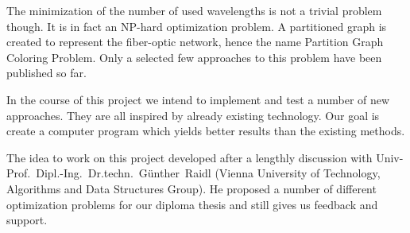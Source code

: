 \documentclass[paper=a4,fontsize=12pt]{scrartcl}
\begin{document}

The minimization of the number of used wavelengths is not a trivial problem though. It is in fact an NP-hard optimization problem. A partitioned graph is created to represent the fiber-optic network, hence the name
Partition Graph Coloring Problem. Only a selected few approaches to this problem have been published so far.


In the course of this project we intend to implement and test a number of new approaches. They are all inspired by already existing technology. Our goal is create a computer program which yields better results than the existing methods. 


The idea to work on this project developed after a lengthly discussion with Univ-Prof.~Dipl.-Ing.~Dr.techn.~Günther~Raidl (Vienna University of Technology, Algorithms and Data Structures Group). He proposed a number of different optimization problems for our diploma thesis and still gives us feedback and support.

\end{document}
